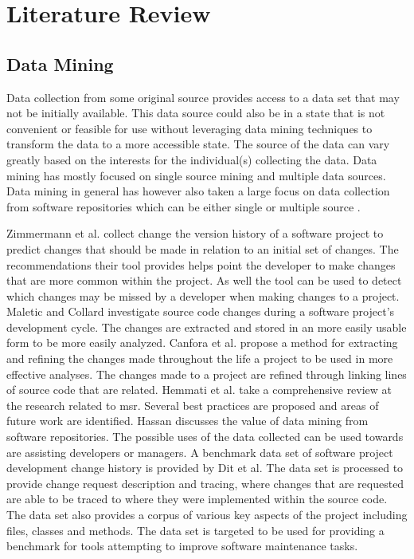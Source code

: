 \chapter{Literature Review}
\label{chap:related_works}


\section{Data Mining}

Data collection from some original source provides access to a data set that may not be initially available. This data source could also be in a state that is not convenient or feasible for use without leveraging data mining techniques to transform the data to a more accessible state. The source of the data can vary greatly based on the interests for the individual(s) collecting the data. Data mining has mostly focused on single source mining and multiple data sources. Data mining in general has however also taken a large focus on data collection from software repositories which can be either single or multiple source \cite{Dit2013, Hassan2006, Hemmati2013, Kagdi2007, Maletic2004, Zimmermann2005a}.%

Zimmermann et al. collect change the version history of a software project to predict changes that should be made in relation to an initial set of changes. The recommendations their tool provides helps point the developer to make changes that are more common within the project. As well the tool can be used to detect which changes may be missed by a developer when making changes to a project. Maletic and Collard investigate source code changes during a software project's development cycle. The changes are extracted and stored in an more easily usable form to be more easily analyzed. Canfora et al. propose a method for extracting and refining the changes made throughout the life a project to be used in more effective analyses. The changes made to a project are refined through linking lines of source code that are related. Hemmati et al. take a comprehensive review at the research related to \gls{msr}. Several best practices are proposed and areas of future work are identified. Hassan discusses the value of data mining from software repositories. The possible uses of the data collected can be used towards are assisting developers or managers. A benchmark data set of software project development change history is provided by Dit et al. The data set is processed to provide change request description and tracing, where changes that are requested are able to be traced to where they were implemented within the source code. The data set also provides a corpus of various key aspects of the project including files, classes and methods. The data set is targeted to be used for providing a benchmark for tools attempting to improve software maintenance tasks.

